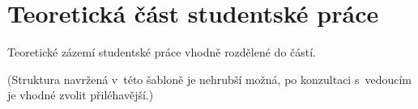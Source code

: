 \chapter{Teoretická část studentské práce}

Teoretické zázemí studentské práce vhodně rozdělené do částí.

(Struktura navržená v~této šabloně je nehrubší možná, po konzultaci s~vedoucím je vhodné zvolit přiléhavější.)
